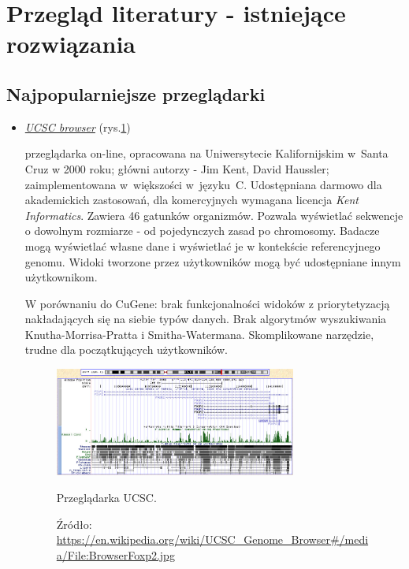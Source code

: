 \section{Przegląd literatury - istniejące rozwiązania}

\subsection*{Najpopularniejsze przeglądarki}
\begin{itemize}
	\item \href{https://genome.ucsc.edu}{\emph{UCSC browser}} (rys.\ref{img:przegladarka-UCSC}) \label{przegladarka-UCSC}
	
	przeglądarka on-line, opracowana na Uniwersytecie Kalifornijskim w~Santa Cruz w 2000 roku; główni autorzy - Jim Kent, David Haussler; zaimplementowana w~większości w~języku~C. Udostępniana darmowo dla akademickich zastosowań, dla komercyjnych wymagana licencja \emph{Kent Informatics}. Zawiera 46 gatunków organizmów. Pozwala wyświetlać sekwencje o dowolnym rozmiarze - od pojedynczych zasad po chromosomy. Badacze mogą wyświetlać własne dane i wyświetlać je w kontekście referencyjnego genomu. Widoki tworzone przez użytkowników mogą być udostępniane innym użytkownikom.
	
	W porównaniu do CuGene:
	brak funkcjonalności widoków z priorytetyzacją nakładających się na siebie typów danych. Brak algorytmów wyszukiwania Knutha-Morrisa-Pratta i Smitha-Watermana. Skomplikowane narzędzie, trudne dla początkujących użytkowników.
	\begin{figure}[h]
		\centering
		\includegraphics[width=0.75\textwidth]{img/browser-UCSC.jpg}
		\caption{Przeglądarka UCSC.}
		\vspace{-0.5cm}
		\caption*{\scriptsize Źródło: \url{https://en.wikipedia.org/wiki/UCSC\_Genome\_Browser\#/media/File:BrowserFoxp2.jpg}}
		\label{img:przegladarka-UCSC}
	\end{figure}
	

\end{itemize}
